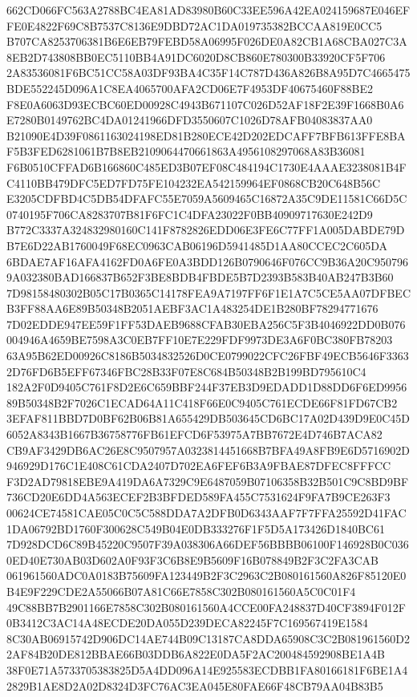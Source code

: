 \documentclass[UTF8,fontset=fandol,zihao=-4,a4paper]{ctexart}
\begin{document}
{{662CD066FC563A2788BC4EA81AD83980B60C33EE596A42EA024159687E046EFFE0E4822F69C8B7537C8136E9DBD72AC1DA019735382BCCAA819E0CC5
B707CA8253706381B6E6EB79FEBD58A06995F026DE0A82CB1A68CBA027C3A8EB2D743808BB0EC5110BB4A91DC6020D8CB860E780300B33920CF5F706
2A83536081F6BC51CC58A03DF93BA4C35F14C787D436A826B8A95D7C4665475BDE552245D096A1C8EA4065700AFA2CD06E7F4953DF40675460F88BE2
F8E0A6063D93ECBC60ED00928C4943B671107C026D52AF18F2E39F1668B0A6E7280B0149762BC4DA01241966DFD3550607C1026D78AFB04083837AA0
B21090E4D39F0861163024198ED81B280ECE42D202EDCAFF7BFB613FFE8BAF5B3FED6281061B7B8EB2109064470661863A4956108297068A83B36081
F6B0510CFFAD6B166860C485ED3B07EF08C484194C1730E4AAAE3238081B4FC4110BB479DFC5ED7FD75FE104232EA542159964EF0868CB20C648B56C
E3205CDFBD4C5DB54DFAFC55E7059A5609465C16872A35C9DE11581C66D5C0740195F706CA8283707B81F6FC1C4DFA23022F0BB40909717630E242D9
B772C3337A324832980160C141F8782826EDD06E3FE6C77FF1A005DABDE79DB7E6D22AB1760049F68EC0963CAB06196D5941485D1AA80CCEC2C605DA
6BDAE7AF16AFA4162FD0A6FE0A3BDD126B0790646F076CC9B36A20C9507969A032380BAD166837B652F3BE8BDB4FBDE5B7D2393B583B40AB247B3B60
7D98158480302B05C17B0365C14178FEA9A7197FF6F1E1A7C5CE5AA07DFBECB3FF88AA6E89B50348B2051AEBF3AC1A483254DE1B280BF78294771676
7D02EDDE947EE59F1FF53DAEB9688CFAB30EBA256C5F3B4046922DD0B076004946A4659BE7598A3C0EB7FF10E7E229FDF9973DE3A6F0BC380FB78203
63A95B62ED00926C8186B5034832526D0CE0799022CFC26FBF49ECB5646F33632D76FD6B5EFF67346FBC28B33F07E8C684B50348B2B199BD795610C4
182A2F0D9405C761F8D2E6C659BBF244F37EB3D9EDADD1D88DD6F6ED995689B50348B2F7026C1ECAD64A11C418F66E0C9405C761ECDE66F81FD67CB2
3EFAF811BBD7D0BF62B06B81A655429DB503645CD6BC17A02D439D9E0C45D6052A8343B1667B36758776FB61EFCD6F53975A7BB7672E4D746B7ACA82
CB9AF3429DB6AC26E8C9507957A0323814451668B7BFA49A8FB9E6D5716902D946929D176C1E408C61CDA2407D702EA6FEF6B3A9FBAE87DFEC8FFFCC
F3D2AD79818EBE9A419DA6A7329C9E6487059B07106358B32B501C9C8BD9BF736CD20E6DD4A563ECEF2B3BFDED589FA455C7531624F9FA7B9CE263F3
00624CE74581CAE05C0C5C588DDA7A2DFB0D6343AAF7F7FFA25592D41FAC1DA06792BD1760F300628C549B04E0DB333276F1F5D5A173426D1840BC61
7D928DCD6C89B45220C9507F39A038306A66DEF56BBBB06100F146928B0C0360ED40E730AB03D602A0F93F3C6B8E9B5609F16B078849B2F3C2FA3CAB
061961560ADC0A0183B75609FA123449B2F3C2963C2B080161560A826F85120E0B4E9F229CDE2A55066B07A81C66E7858C302B080161560A5C0C01F4
49C88BB7B2901166E7858C302B080161560A4CCE00FA248837D40CF3894F012F0B3412C3AC14A48ECDE20DA055D239DECA82245F7C169567419E1584
8C30AB06915742D906DC14AE744B09C13187CA8DDA65908C3C2B081961560D22AF84B20DE812BBAE66B03DDB6A822E0DA5F2AC200484592908BE1A4B
38F0E71A5733705383825D5A4DD096A14E925583ECDBB1FA80166181F6BE1A42829B1AE8D2A02D8324D3FC76AC3EA045E80FAE66F48CB79AA04B83B5
}}
\end{document}
